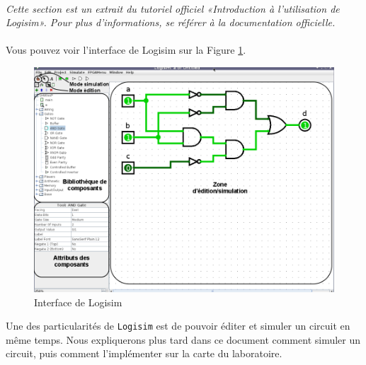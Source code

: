 \paragraph{}

\textit{Cette section est un extrait du tutoriel officiel «Introduction à l’utilisation de Logisim». Pour plus d'informations, se référer à la documentation officielle.}
\paragraph{}

Vous pouvez voir l'interface de Logisim sur la Figure  \ref{fig_logisim_description}.

\begin{figure}[t]
\begin{center}
\includegraphics[width=500pt]{pictures/Logisim_description.png}
\caption{\label{fig_logisim_description}Interface de Logisim}
\end{center}
\end{figure}

Une des particularités de \texttt{Logisim} est de pouvoir éditer et simuler un circuit en même temps.
Nous expliquerons plus tard dans ce document comment simuler un circuit, puis comment l'implémenter sur la carte du
laboratoire.


